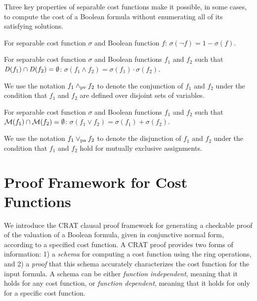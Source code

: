 \documentclass{llncs}
\newcommand{\pand}{\mathbin{\land_{\rm pv}}}
\newcommand{\por}{\mathbin{\lor_{\rm pa}}}
\newcommand{\interpset}[1]{{\cal M}(#1)}
\newcommand{\cost}{\sigma}
\newcommand{\depend}{{\it D}}
\begin{document}
Three key properties of separable cost functions make it possible, in
some cases, to compute the cost of a Boolean formula without
enumerating all of its satisfying solutions.


\begin{lemma}[Complementation]
\label{lemma:complementation}
  For separable cost function $\cost$ and Boolean function $f$:
  $\cost(\neg f) = 1 - \cost(f)$.
\end{lemma}

\begin{lemma}
\label{lemma:conjunction}
  For separable cost function $\cost$ and Boolean functions $f_1$ and $f_2$ such that $\depend(f_1) \cap \depend(f_2) = \emptyset$:
    $\cost(f_1 \land f_2) = \cost(f_1) \cdot \cost(f_2)$.
\end{lemma}
We use the notation $f_1 \pand f_2$ to denote the conjunction of $f_1$ and
$f_2$ under the condition that $f_1$ and $f_2$ are defined over
disjoint sets of variables.

\begin{lemma}
\label{lemma:disjunction}
  For separable cost function $\cost$ and Boolean functions $f_1$ and $f_2$ such that $\interpset{f_1} \cap \interpset{f_2} = \emptyset$:
    $\cost(f_1 \lor f_2) = \cost(f_1) + \cost(f_2)$.
\end{lemma}
We use the notation $f_1 \por f_2$ to denote the disjunction of $f_1$ and $f_2$ under the
condition that $f_1$ and $f_2$ hold for mutually exclusive assignments.

\section{Proof Framework for Cost Functions}

We introduce the CRAT clausal proof framework for generating a
checkable proof of the valuation of a Boolean formula, given in
conjunctive normal form, according to a specified cost function.  A
CRAT proof provides two forms of information: 1) a {\em schema} for computing a cost
function using the ring operations, and 2) a {\em proof} that this schema
accurately characterizes the cost function for the input formula.
A schema can be either {\em function independent}, meaning that it holds
for any cost function, or {\em function dependent}, meaning that
it holds for only for a specific cost function.
\end{document}
